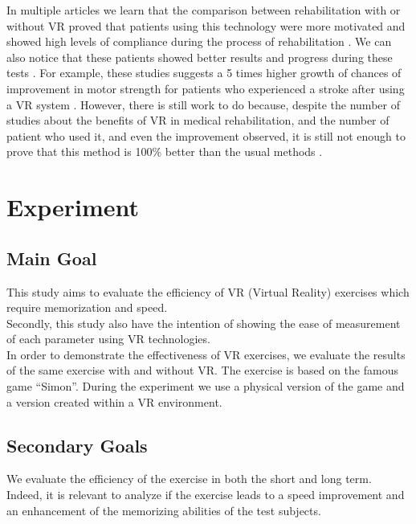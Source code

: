 \documentclass[12pt, openany, twocolumn]{article}
\begin{document}
In multiple articles we learn that the comparison between rehabilitation with or without VR proved that patients using this technology were more motivated and showed high levels of compliance during the process of rehabilitation \cite{sampaioDoesVirtualRealitybased2016, chenProgressSensorimotorRehabilitative2014}.
We can also notice that these patients showed better results and progress during these tests \cite{corbettaRehabilitationThatIncorporates2015, saposnikEffectivenessVirtualReality2010, chenProgressSensorimotorRehabilitative2014, saposnikgustavoVirtualRealityStroke2011}.
For example, these studies suggests a 5 times higher growth of chances of improvement in motor strength for patients who experienced a stroke after using a VR system \cite{saposnikgustavoVirtualRealityStroke2011}.
However, there is still work to do because, despite the number of studies about the benefits of VR in medical rehabilitation, and the number of patient who used it, and even the improvement observed, it is still not enough to prove that this method is 100\% better than the usual methods \cite{saposnikEffectivenessVirtualReality2010, saposnikgustavoVirtualRealityStroke2011, luque-morenoDecadeProgressUsing2015}.

\section{Experiment}

    \subsection{Main Goal}
    This study aims to evaluate the efficiency of VR (Virtual Reality) exercises which require memorization and speed. \\ 

    Secondly, this study also have the intention of showing the ease of measurement of each parameter using VR technologies. \\
    In order to demonstrate the effectiveness of VR exercises, we evaluate the results of the same exercise with and without VR. The exercise is based on the famous game “Simon”. 
    During the experiment we use a physical version of the game and a version created within a VR environment. \\

    \subsection{Secondary Goals}
    We evaluate the efficiency of the exercise in both the short and long term. \\
    Indeed, it is relevant to analyze if the exercise leads to a speed improvement and an enhancement of the memorizing abilities of the test subjects. \\
\end{document}
